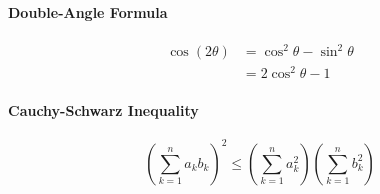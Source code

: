\documentclass[12pt]{article}
\begin{document}
\paragraph{Double-Angle Formula}
\begin{align*}
\cos(2\theta) &= \cos^2\theta - \sin^2\theta \\
&= 2\cos^2\theta - 1
\end{align*}

\paragraph{Cauchy-Schwarz Inequality}
\[
\left( \sum_{k=1}^n a_k b_k \right)^2 \leq \left( \sum_{k=1}^n a_k^2 \right)\left( \sum_{k=1}^n b_k^2 \right)
\]
\end{document}
